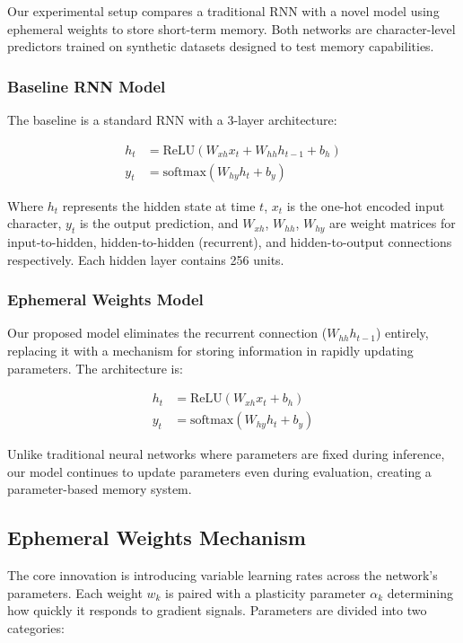 \documentclass{article} %
\begin{document}
Our experimental setup compares a traditional RNN with a novel model using ephemeral weights to store short-term memory. Both networks are character-level predictors trained on synthetic datasets designed to test memory capabilities.

\subsubsection{Baseline RNN Model}

The baseline is a standard RNN with a 3-layer architecture:

\begin{align}
h_t &= \text{ReLU}(W_{xh}x_t + W_{hh}h_{t-1} + b_h)\\
y_t &= \text{softmax}(W_{hy}h_t + b_y)
\end{align}

Where $h_t$ represents the hidden state at time $t$, $x_t$ is the one-hot encoded input character, $y_t$ is the output prediction, and $W_{xh}$, $W_{hh}$, $W_{hy}$ are weight matrices for input-to-hidden, hidden-to-hidden (recurrent), and hidden-to-output connections respectively. Each hidden layer contains 256 units.

\subsubsection{Ephemeral Weights Model}

Our proposed model eliminates the recurrent connection ($W_{hh}h_{t-1}$) entirely, replacing it with a mechanism for storing information in rapidly updating parameters. The architecture is:

\begin{align}
h_t &= \text{ReLU}(W_{xh}x_t + b_h)\\
y_t &= \text{softmax}(W_{hy}h_t + b_y)
\end{align}

Unlike traditional neural networks where parameters are fixed during inference, our model continues to update parameters even during evaluation, creating a parameter-based memory system.

\subsection{Ephemeral Weights Mechanism}

The core innovation is introducing variable learning rates across the network's parameters. Each weight $w_k$ is paired with a plasticity parameter $\alpha_k$ determining how quickly it responds to gradient signals. Parameters are divided into two categories:
\end{document}

